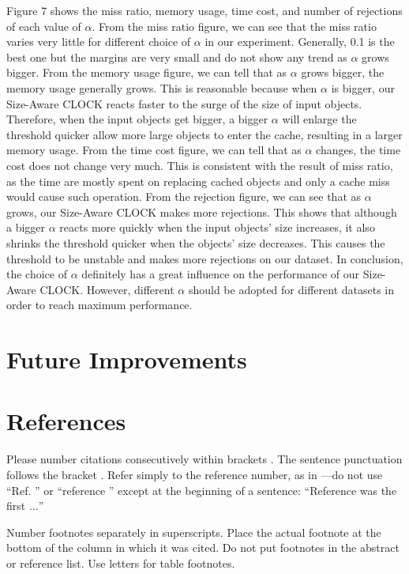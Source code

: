 \documentclass[conference]{IEEEtran}
\begin{document}
Figure 7 shows the miss ratio, memory usage, time cost, and number of rejections of each value of $\alpha$.
From the miss ratio figure, we can see that the miss ratio varies very little for different choice of $\alpha$ in our experiment. Generally, 0.1 is the best one but the margins are very small and do not show any trend as $\alpha$ grows bigger.
From the memory usage figure, we can tell that as $\alpha$ grows bigger, the memory usage generally grows. This is reasonable because when $\alpha$ is bigger, our Size-Aware CLOCK reacts faster to the surge of the size of input objects. Therefore, when the input objects get bigger, a bigger $\alpha$ will enlarge the threshold quicker allow more large objects to enter the cache, resulting in a larger memory usage.
From the time cost figure, we can tell that as $\alpha$ changes, the time cost does not change very much. This is consistent with the result of miss ratio, as the time are mostly spent on replacing cached objects and only a cache miss would cause such operation.
From the rejection figure, we can see that as $\alpha$ grows, our Size-Aware CLOCK makes more rejections. This shows that although a bigger $\alpha$ reacts more quickly when the input objects' size increases, it also shrinks the threshold quicker when the objects' size decreases. This causes the threshold to be unstable and makes more rejections on our dataset.
In conclusion, the choice of $\alpha$ definitely has a great influence on the performance of our Size-Aware CLOCK. However, different $\alpha$ should be adopted for different datasets in order to reach maximum performance.


\section{Future Improvements}


\section*{References}

Please number citations consecutively within brackets \cite{b1}. The
sentence punctuation follows the bracket \cite{b2}. Refer simply to the reference
number, as in \cite{b3}---do not use ``Ref. \cite{b3}'' or ``reference \cite{b3}'' except at
the beginning of a sentence: ``Reference \cite{b3} was the first $\ldots$''

Number footnotes separately in superscripts. Place the actual footnote at
the bottom of the column in which it was cited. Do not put footnotes in the
abstract or reference list. Use letters for table footnotes.
\end{document}
